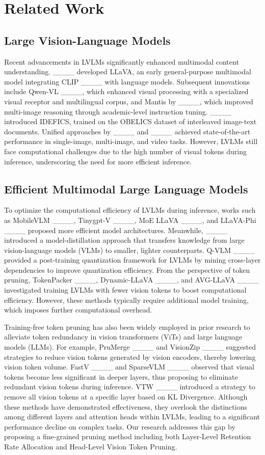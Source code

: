 \section{Related Work}
\label{sec::related}

\subsection{Large Vision-Language Models}\label{sec::relatedwork1}
Recent advancements in LVLMs significantly enhanced multimodal content understanding. ____ developed LLaVA, an early general-purpose multimodal model integrating CLIP ____ with language models. Subsequent innovations include Qwen-VL ____, which enhanced visual processing with a specialized visual receptor and multilingual corpus, and Mantis by ____, which improved multi-image reasoning through academic-level instruction tuning. ____ introduced IDEFICS, trained on the OBELICS dataset of interleaved image-text documents. Unified approaches by ____ and ____ achieved state-of-the-art performance in single-image, multi-image, and video tasks. However, LVLMs still face computational challenges due to the high number of visual tokens during inference, underscoring the need for more efficient inference.

\subsection{Efficient Multimodal Large Language Models}\label{sec::relatedwork2}
To optimize the computational efficiency of LVLMs during inference, works such as MobileVLM ____, Tinygpt-V ____, MoE LLaVA ____, and LLaVA-Phi ____ proposed more efficient model architectures. Meanwhile, ____ introduced a model-distillation approach that transfers knowledge from large vision-language models (VLMs) to smaller, lighter counterparts. Q-VLM ____ provided a post-training quantization framework for LVLMs by mining cross-layer dependencies to improve quantization efficiency. From the perspective of token pruning, TokenPacker ____, Dynamic-LLaVA ____, and AVG-LLaVA ____ investigated training LVLMs with fewer vision tokens to boost computational efficiency. However, these methods typically require additional model training, which imposes further computational overhead.

Training-free token pruning has also been widely employed in prior research to alleviate token redundancy in vision transformers (ViTs) and large language models (LLMs). For example, PruMerge ____ and VisionZip ____ suggested strategies to reduce vision tokens generated by vision encoders, thereby lowering vision token volume. FastV ____ and SparseVLM ____ observed that visual tokens become less significant in deeper layers, thus proposing to eliminate redundant vision tokens during inference. VTW ____ introduced a strategy to remove all vision tokens at a specific layer based on KL Divergence. Although these methods have demonstrated effectiveness, they overlook the distinctions among different layers and attention heads within LVLMs, leading to a significant performance decline on complex tasks. Our research addresses this gap by proposing a fine-grained pruning method including both Layer-Level Retention Rate Allocation and Head-Level Vision Token Pruning.